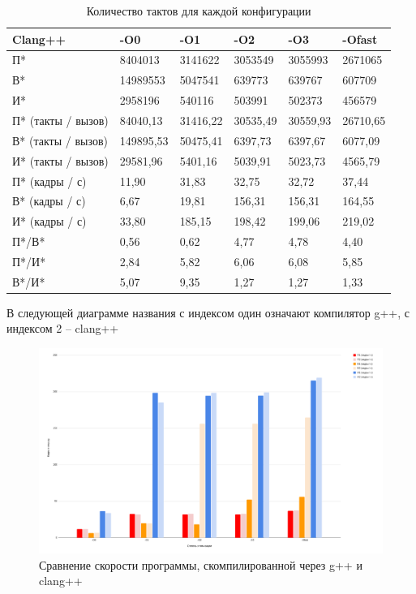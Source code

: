 \documentclass[a4paper, 12pt]{article}
\begin{document}
\begin{table}[h]
\begin{tabular}{|l|l|l|l|l|l|}
    \hline
       Clang++ & -O0 & -O1 & -O2 & -O3 & -Ofast \\ \hline
        П* & 8404013 & 3141622 & 3053549 & 3055993 & 2671065 \\ \hline
        В* & 14989553 & 5047541 & 639773 & 639767 & 607709 \\ \hline
        И* & 2958196 & 540116 & 503991 & 502373 & 456579 \\ \hline
        П* (такты / вызов) & 84040,13 & 31416,22 & 30535,49 & 30559,93 & 26710,65 \\ \hline
        В* (такты / вызов) & 149895,53 & 50475,41 & 6397,73 & 6397,67 & 6077,09 \\ \hline
        И* (такты / вызов) & 29581,96 & 5401,16 & 5039,91 & 5023,73 & 4565,79 \\ \hline
        П* (кадры / с) & 11,90 & 31,83 & 32,75 & 32,72 & 37,44 \\ \hline
        В* (кадры / с) & 6,67 & 19,81 & 156,31 & 156,31 & 164,55 \\ \hline
        И* (кадры / с) & 33,80 & 185,15 & 198,42 & 199,06 & 219,02 \\ \hline
        П*/В* & 0,56 & 0,62 & 4,77 & 4,78 & 4,40 \\ \hline
        П*/И* & 2,84 & 5,82 & 6,06 & 6,08 & 5,85 \\ \hline
        В*/И* & 5,07 & 9,35 & 1,27 & 1,27 & 1,33 \\ \hline
    \end{tabular}
    \caption{Количество тактов для каждой конфигурации}
\end{table}
\newpage

\raggedright
В следующей диаграмме названия с индексом один означают компилятор g++, с индексом 2 -- clang++ 
\begin{figure}[h]
    \centering
    \includegraphics[width=1\linewidth]{chart.png}
    \caption{Сравнение скорости программы, скомпилированной через g++ и clang++}
\end{figure}
\end{document}
